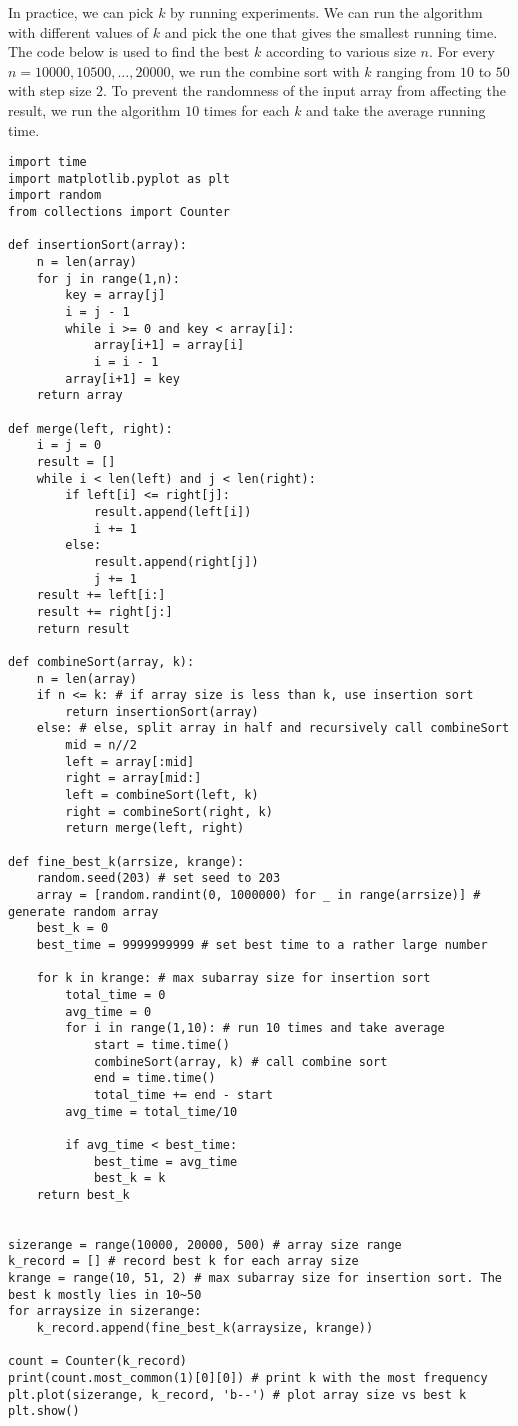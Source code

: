 \documentclass[UTF8]{ctexart}
\begin{document}
In practice, we can pick $k$ by running experiments. We can run the algorithm with different values of $k$ and pick the one that gives the smallest running time. 
The code below is used to find the best $k$ according to various size $n$. For every $n= 10000, 10500, \ldots, 20000$, we run the combine sort with $k$ ranging from $10$ to $50$ with step size $2$.
To prevent the randomness of the input array from affecting the result, we run the algorithm $10$ times for each $k$ and take the average running time.\\
\begin{lstlisting}
import time
import matplotlib.pyplot as plt
import random
from collections import Counter

def insertionSort(array):
    n = len(array)
    for j in range(1,n):
        key = array[j]
        i = j - 1
        while i >= 0 and key < array[i]:
            array[i+1] = array[i]
            i = i - 1
        array[i+1] = key
    return array

def merge(left, right):
    i = j = 0
    result = []
    while i < len(left) and j < len(right):
        if left[i] <= right[j]:
            result.append(left[i]) 
            i += 1
        else:
            result.append(right[j])
            j += 1
    result += left[i:]
    result += right[j:]
    return result

def combineSort(array, k):
    n = len(array)
    if n <= k: # if array size is less than k, use insertion sort
        return insertionSort(array)
    else: # else, split array in half and recursively call combineSort
        mid = n//2
        left = array[:mid]
        right = array[mid:]
        left = combineSort(left, k)
        right = combineSort(right, k)
        return merge(left, right)

def fine_best_k(arrsize, krange):
    random.seed(203) # set seed to 203
    array = [random.randint(0, 1000000) for _ in range(arrsize)] # generate random array
    best_k = 0
    best_time = 9999999999 # set best time to a rather large number

    for k in krange: # max subarray size for insertion sort
        total_time = 0
        avg_time = 0
        for i in range(1,10): # run 10 times and take average
            start = time.time()
            combineSort(array, k) # call combine sort
            end = time.time()
            total_time += end - start
        avg_time = total_time/10
        
        if avg_time < best_time:
            best_time = avg_time
            best_k = k
    return best_k


sizerange = range(10000, 20000, 500) # array size range
k_record = [] # record best k for each array size
krange = range(10, 51, 2) # max subarray size for insertion sort. The best k mostly lies in 10~50
for arraysize in sizerange:
    k_record.append(fine_best_k(arraysize, krange))
    
count = Counter(k_record)
print(count.most_common(1)[0][0]) # print k with the most frequency
plt.plot(sizerange, k_record, 'b--') # plot array size vs best k
plt.show()
\end{lstlisting}
\end{document}
